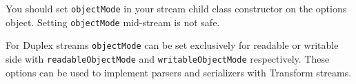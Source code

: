 You should set \texttt{objectMode} in your stream child class
constructor on the options object. Setting \texttt{objectMode}
mid-stream is not safe.

For Duplex streams \texttt{objectMode} can be set exclusively for
readable or writable side with \texttt{readableObjectMode} and
\texttt{writableObjectMode} respectively. These options can be used to
implement parsers and serializers with Transform streams.

\begin{Shaded}
\begin{Highlighting}[]
 \NormalTok{(}\NormalTok{);}
 \NormalTok{(}\NormalTok{;}
 \NormalTok{(}\NormalTok{;}

 \NormalTok{() \{}
   \NormalTok{(!(}  
      \NormalTok{();}

  \NormalTok{(}\NormalTok{, \{ }\NormalTok{: } \NormalTok{\});}

   \NormalTok{= }\NormalTok{;}
   \NormalTok{= } \NormalTok{(}\NormalTok{);}
\NormalTok{\}}


\end{Highlighting}
\end{Shaded}
